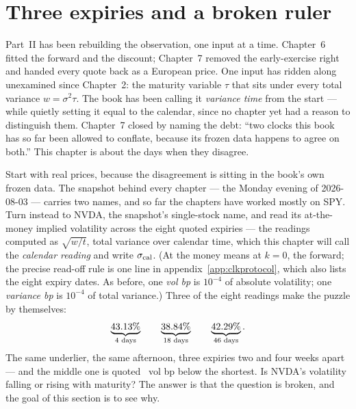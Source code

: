 \section{Three expiries and a broken ruler}
\label{sec:clkboard}

Part~II has been rebuilding the observation, one input at a time.
Chapter~6 fitted the forward and the discount; Chapter~7 removed the
early-exercise right and handed every quote back as a European price.
One input has ridden along unexamined since Chapter~2: the maturity
variable $\tau$ that sits under every total variance $w=\sigma^2\tau$.
The book has been calling it \emph{variance time} from the start ---
while quietly setting it equal to the calendar, since no chapter yet
had a reason to distinguish them.  Chapter~7 closed by naming the
debt: ``two clocks this book has so far been allowed to conflate,
because its frozen data happens to agree on both.''  This chapter is
about the days when they disagree.

Start with real prices, because the disagreement is sitting in the
book's own frozen data.  The snapshot behind every chapter --- the
Monday evening of 2026-08-03 --- carries two names, and so far the
chapters have worked mostly on SPY.  Turn instead to NVDA, the
snapshot's single-stock name, and read its at-the-money implied
volatility across the eight quoted expiries --- the readings computed
as $\sqrt{w/t}$, total variance over calendar time, which this
chapter will call the \emph{calendar reading} and write
$\sigma_{\rm cal}$.  (At the money means at $k=0$, the forward; the
precise read-off rule is one line in
appendix~\ref{app:clkprotocol}, which also lists the eight expiry
dates.  As before, one \emph{vol bp} is $10^{-4}$ of absolute
volatility; one \emph{variance bp} is $10^{-4}$ of total variance.)
Three of the eight readings make the puzzle by themselves:
\[
\underbrace{43.13\%}_{\text{4 days}}
\qquad
\underbrace{38.84\%}_{\text{18 days}}
\qquad
\underbrace{42.29\%}_{\text{46 days}} .
\]
The same underlier, the same afternoon, three expiries two and four
weeks apart --- and the middle one is quoted
\MacClkBoardDipBp\ vol bp below the shortest.  Is NVDA's volatility
falling or rising with maturity?  The answer is that the
question is broken, and the goal of this section is to see why.

